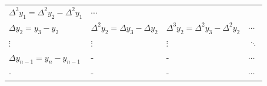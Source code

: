 \documentclass[openany]{book}
\begin{document}
\begin{longtable}[]{@{}llll@{}}
\begin{minipage}[t]{0.31\columnwidth}
\(\Delta^3 y_1 = \Delta^2 y_{2} - \Delta^2 y_1\)\strut
\end{minipage} & \begin{minipage}[t]{0.06\columnwidth}\raggedright
\(\cdots\)\strut
\end{minipage}\tabularnewline
\begin{minipage}[t]{0.22\columnwidth}\raggedright
\(\Delta y_2 = y_3 - y_2\)\strut
\end{minipage} & \begin{minipage}[t]{0.29\columnwidth}\raggedright
\(\Delta^2 y_2 = \Delta y_{3} - \Delta y_2\)\strut
\end{minipage} & \begin{minipage}[t]{0.31\columnwidth}\raggedright
\(\Delta^3 y_2 = \Delta^2 y_{3} - \Delta^2 y_2\)\strut
\end{minipage} & \begin{minipage}[t]{0.06\columnwidth}\raggedright
\(\cdots\)\strut
\end{minipage}\tabularnewline
\begin{minipage}[t]{0.22\columnwidth}\raggedright
\(\vdots\)\strut
\end{minipage} & \begin{minipage}[t]{0.29\columnwidth}\raggedright
\(\vdots\)\strut
\end{minipage} & \begin{minipage}[t]{0.31\columnwidth}\raggedright
\(\vdots\)\strut
\end{minipage} & \begin{minipage}[t]{0.06\columnwidth}\raggedright
\(\ddots\)\strut
\end{minipage}\tabularnewline
\begin{minipage}[t]{0.22\columnwidth}\raggedright
\(\Delta y_{n-1} = y_{n} - y_{n-1}\)\strut
\end{minipage} & \begin{minipage}[t]{0.29\columnwidth}\raggedright
-\strut
\end{minipage} & \begin{minipage}[t]{0.31\columnwidth}\raggedright
-\strut
\end{minipage} & \begin{minipage}[t]{0.06\columnwidth}\raggedright
\(\cdots\)\strut
\end{minipage}\tabularnewline
\begin{minipage}[t]{0.22\columnwidth}\raggedright
-\strut
\end{minipage} & \begin{minipage}[t]{0.29\columnwidth}\raggedright
-\strut
\end{minipage} & \begin{minipage}[t]{0.31\columnwidth}\raggedright
-\strut
\end{minipage} & \begin{minipage}[t]{0.06\columnwidth}\raggedright
\(\cdots\)\strut
\end{minipage}\tabularnewline
\bottomrule
\end{longtable}
\end{document}
